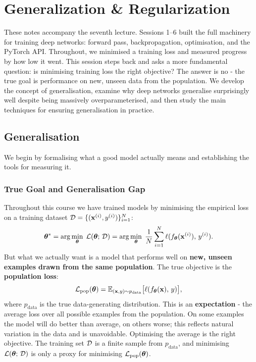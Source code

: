 \section{Generalization \& Regularization}\label{sec:regularization}

These notes accompany the seventh lecture. Sessions 1--6 built the full machinery for training deep networks: forward pass, backpropagation, optimisation, and the PyTorch API. Throughout, we minimised a training loss and measured progress by how low it went. This session steps back and asks a more fundamental question: is minimising training loss the right objective? The answer is no - the true goal is performance on new, unseen data from the population. We develop the concept of generalisation, examine why deep networks generalise surprisingly well despite being massively overparameterised, and then study the main techniques for ensuring generalisation in practice.

\subsection{Generalisation}

We begin by formalising what a good model actually means and establishing the tools for measuring it.

\subsubsection{True Goal and Generalisation Gap}

Throughout this course we have trained models by minimising the empirical loss on a training dataset $\mathcal{D} = \{(\mathbf{x}^{(i)}, y^{(i)})\}_{i=1}^{N}$:
\begin{equation}
    \boldsymbol{\theta}^* = \arg\min_{\boldsymbol{\theta}}\; \mathcal{L}(\boldsymbol{\theta};\, \mathcal{D})
    = \arg\min_{\boldsymbol{\theta}}\; \frac{1}{N} \sum_{i=1}^{N} \ell(f_{\boldsymbol{\theta}}(\mathbf{x}^{(i)}),\, y^{(i)}).
\end{equation}
But what we actually want is a model that performs well on \textbf{new, unseen examples drawn from the same population}. The true objective is the \textbf{population loss}:
\begin{equation}
    \mathcal{L}_{\text{pop}}(\boldsymbol{\theta}) = \mathbb{E}_{(\mathbf{x}, y) \sim p_{\text{data}}}\bigl[\ell(f_{\boldsymbol{\theta}}(\mathbf{x}),\, y)\bigr],
\end{equation}
where $p_{\text{data}}$ is the true data-generating distribution. This is an \textbf{expectation} - the average loss over all possible examples from the population. On some examples the model will do better than average, on others worse; this reflects natural variation in the data and is unavoidable. Optimising the average is the right objective. The training set $\mathcal{D}$ is a finite sample from $p_{\text{data}}$, and minimising $\mathcal{L}(\boldsymbol{\theta};\, \mathcal{D})$ is only a proxy for minimising $\mathcal{L}_{\text{pop}}(\boldsymbol{\theta})$.


